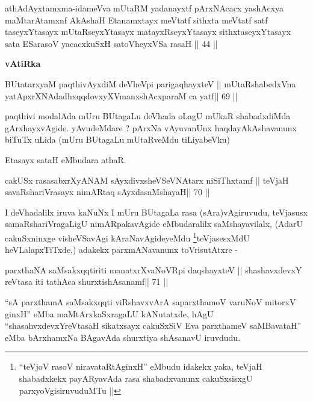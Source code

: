 \begin{shl}
athAdAyxtamxma-idameVva mUtaRM yadanayxtf pArxNAcacx yashAcxya
maMtarAtamxnf AkAshaH Etanamxtayx meVtatf sithxta meVtatf satf
taseyxYtasayx mUtaRseyxYtasayx matayxRseyxYtasayx sithxtaseyxYtasayx
sata ESarasoV yacacxkuSxH satoVheyxVSa rasaH || 44 ||
\end{shl}

{\centerline{\textbf{vAtiRka}}}

\begin{shl}
BUtatarxyaM paqthivAyxdiM deVheV\s pi parigaqhayxteV ||
mUtaRshabedxVna yatApxrXNAdadhxqqdovxyXVmanxshAcxparaM ca yatf\hfill || 69 ||
\end{shl}

\begin{artha}
paqthivi modalAda mUru BUtagaLu deVhada oLagU mUkaR shabadxdiMda
gArxhayxvAgide. yAvudeMdare ? pArxNa vAyuvanUnx haqdayAkAshavanunx
biTuTx uLida (mUru BUtagaLu mUtaRveMdu tiLiyabeVku)

Etasayx sataH eMbudara athaR.
\end{artha}

\begin{shl}
cakUSx rasasabxrXyANAM sAyxdivxsheVSeVNAtarx niSiThxtamf ||
teVjaH savaRshariVrasayx nimARtaq sAyxdasaMshayaH\hfill || 70 ||
\end{shl}

\begin{artha}
I deVhadalilx iruva kaNuNx I mUru BUtagaLa rasa (sAra)vAgiruvudu,
teVjasusx samaRshariVragaLigU nimARpakavAgide eMbudaralilx
saMshayavilalx, (AdarU cakuSxninxge visheVSavAgi
kAraNavAgideyeMdu \footnote{``teVjoV rasoV niravataRtAginxH'' eMbudu
  idakekx yaka, teVjaH shabadxkekx payARyavAda rasa shabadxvanunx
  cakuSxsisxgU parxyoVgisiruvuduMTu ||}teVjasesxMdU heVLalapxTiTxde,)
adakekx parxmANavanunx toVrisutAtxre -
\end{artha}

\begin{shl}
parxthaNA saMsakxqqtiriti manatxrXvaNoVR\s pi daqshayxteV ||
shashavxdevxY reVtasa iti tathAca shurxtishAsanamf\hfill || 71 ||
\end{shl}

\begin{artha}
``sA parxthamA saMsakxqqti viRshavxvArA saparxthamoV varuNoV mitorxV\s
  ginxH'' eMba maMtArxkaSxragaLU kANutatxde, hAgU
  ``shasahvxdevxYreVtasaH sikatxsayx cakuSxSiV Eva parxthameV
  saMBavataH'' eMba bArxhamxNa BAgavAda shurxtiya shAsanavU iruvdudu.
\end{artha}

